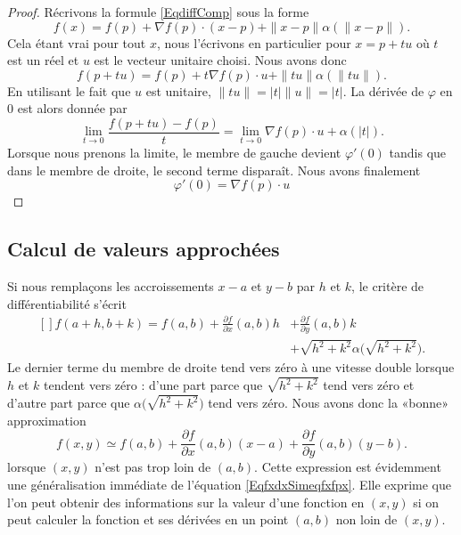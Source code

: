 \begin{proof}
    Récrivons la formule \eqref{EqdiffComp} sous la forme
    \begin{equation}
        f(x)=f(p)+\nabla f(p)\cdot (x-p)+\| x-p \|\alpha(\| x-p \|).
    \end{equation}
    Cela étant vrai pour tout $x$, nous l'écrivons en particulier pour $x=p+tu$ où $t$ est un réel et $u$ est le vecteur unitaire choisi. Nous avons donc
    \begin{equation}
        f(p+tu)=f(p)+t\nabla f(p)\cdot u+\| tu \|\alpha(\| tu \|).
    \end{equation}
    En utilisant le fait que $u$ est unitaire, $\| tu \|=| t |\| u \|=| t |$. La dérivée de $\varphi$ en $0$ est alors donnée par
    \begin{equation}
        \lim_{t\to 0} \frac{ f(p+tu)-f(p) }{ t }=\lim_{t\to 0} \nabla f(p)\cdot u+\alpha(| t |).
    \end{equation}
    Lorsque nous prenons la limite, le membre de gauche devient $\varphi'(0)$ tandis que dans le membre de droite, le second terme disparaît. Nous avons finalement
    \begin{equation}
        \varphi'(0)=\nabla f(p)\cdot u
    \end{equation}
\end{proof}

\subsection{Calcul de valeurs approchées}

Si nous remplaçons les accroissements $x-a$ et $y-b$ par $h$ et $k$, le critère de différentiabilité s'écrit
\begin{equation}
    \begin{aligned}[]
        f(a+h,b+k)=f(a,b)+\frac{ \partial f }{ \partial x }(a,b)h&+\frac{ \partial f }{ \partial y }(a,b)k\\
        &+\sqrt{h^2+k^2}\alpha\big( \sqrt{h^2+k^2} \big).
    \end{aligned}
\end{equation}
Le dernier terme du membre de droite tend vers zéro à une vitesse double lorsque $h$ et $k$ tendent vers zéro : d'une part parce que $\sqrt{h^2+k^2}$ tend vers zéro et d'autre part parce que $\alpha\big( \sqrt{h^2+k^2} \big)$ tend vers zéro. Nous avons donc la «bonne» approximation
\begin{equation}        \label{EqFormApproxfxyab}
    f(x,y)\simeq f(a,b)+\frac{ \partial f }{ \partial x }(a,b)(x-a)+\frac{ \partial f }{ \partial y }(a,b)(y-b).
\end{equation}
lorsque $(x,y)$ n'est pas trop loin de $(a,b)$. Cette expression est évidemment une généralisation immédiate de l'équation \eqref{EqfxdxSimeqfxfpx}. Elle exprime que l'on peut obtenir des informations sur la valeur d'une fonction en $(x,y)$ si on peut calculer la fonction et ses dérivées en un point $(a,b)$ non loin de $(x,y)$.

